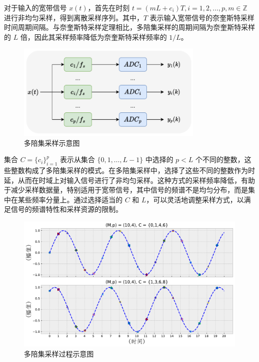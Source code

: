 对于输入的宽带信号 \(x(t)\)，首先在时刻 \(t = (mL + c_i)T, i = 1,2,\ldots,p, m \in \mathbb{Z}\) 进行非均匀采样，得到离散采样序列。其中，\(T\) 表示输入宽带信号的奈奎斯特采样时间周期间隔。与奈奎斯特采样定理相比，多陪集采样的周期间隔为奈奎斯特采样的 \(L\) 倍，因此其采样频率降低为奈奎斯特采样频率的 \(1/L\)。

\begin{figure}
    \centering
    \includegraphics[width=0.8\textwidth]{Image/multi_coset.pdf}
    \caption{多陪集采样示意图}
    \label{fig:multicoset}
\end{figure}

集合 \(C = \{c_i\}_{i=1}^p\) 表示从集合 \(\{0,1,\ldots,L-1\}\) 中选择的 \(p < L\) 个不同的整数，这些整数构成了多陪集采样的模式。在多陪集采样中，选择了这些不同的整数作为时延，从而在时域上对输入信号进行了非均匀采样。这种方式的采样频率降低，有助于减少采样数据量，特别适用于宽带信号，其中信号的频谱不是均匀分布，而是集中在某些频率分量上。通过选择适当的 \(C\) 和 \(L\)，可以灵活地调整采样方式，以满足信号的频谱特性和采样资源的限制。

\begin{figure}
    \centering
    \includegraphics[width=\textwidth]{Image/mcs_process.pdf}
    \caption{多陪集采样过程示意图}
    \label{fig:multicoset_sample}
\end{figure}

